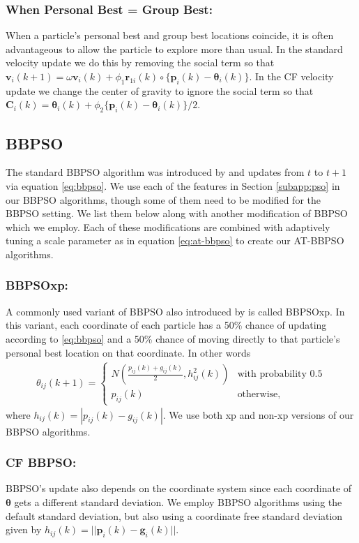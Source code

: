 \documentclass[cmbright]{staauth}
\numberwithin{table}{section}
\begin{document}
\subsubsection{When Personal Best = Group Best:}
When a particle's personal best and group best locations coincide, it is often advantageous to allow the particle to explore more than usual. In the standard velocity update we do this by removing the social term so that $\bm{v}_i(k+1) = \omega \bm{v}_i(k) + \phi_1 \bm{r}_{1i}(k)\circ\{\bm{p}_i(k) - \bm{\theta}_i(k)\}$. In the CF velocity update we change the center of gravity to ignore the social term so that $\bm{C}_i(k) = \bm{\theta}_i(k) + \phi_2\{\bm{p}_i(k) - \bm{\theta}_i(k)\}/2$.

\subsection{BBPSO}\label{subapp:bbpso}
The standard BBPSO algorithm was introduced by \cite{kennedy2003bare} and updates from $t$ to $t+1$ via equation \eqref{eq:bbpso}. We use each of the features in Section \ref{subapp:pso} in our BBPSO algorithms, though some of them need to be modified for the BBPSO setting. We list them below along with another modification of BBPSO which we employ. Each of these modifications are combined with adaptively tuning a scale parameter as in equation \eqref{eq:at-bbpso} to create our AT-BBPSO algorithms.

\subsubsection{BBPSOxp:}
A commonly used variant of BBPSO also introduced by \cite{kennedy2003bare} is called BBPSOxp. In this variant, each coordinate of each particle has a 50\% chance of updating according to \eqref{eq:bbpso} and a 50\% chance of moving directly to that particle's personal best location on that coordinate. In other words
\begin{align}\label{eq:bbpsoxp}
\theta_{ij}(k+1) = \begin{cases} N\left(\frac{p_{ij}(k) + g_{ij}(k)}{2}, h^2_{ij}(k)\right) & \mbox{with probability }0.5\\
p_{ij}(k) &\mbox{otherwise,}\end{cases}
\end{align}
where $h_{ij}(k) = |p_{ij}(k) - g_{ij}(k)|$. We use both xp and non-xp versions of our BBPSO algorithms.

\subsubsection{CF BBPSO:}
BBPSO's update also depends on the coordinate system since each coordinate of $\bm{\theta}$ gets a different standard deviation. We employ BBPSO algorithms using the default standard deviation, but also using a coordinate free standard deviation given by $h_{ij}(k) = ||\bm{p}_i(k) - \bm{g}_i(k)||$.
\end{document}
